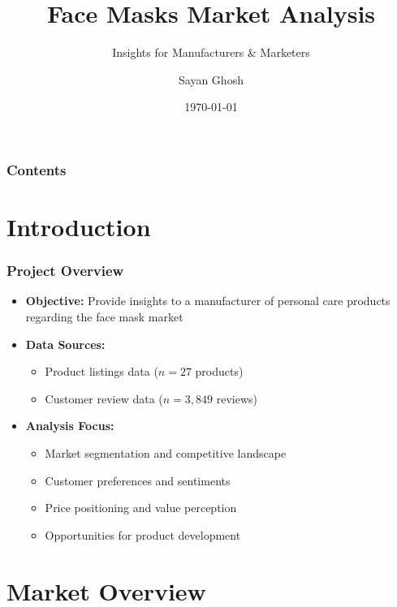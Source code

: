 \documentclass[aspectratio=169]{beamer}
\title{Face Masks Market Analysis}
\subtitle{Insights for Manufacturers \& Marketers}
\author{Sayan Ghosh}
\date{\today}
\institute{Indian Institute of Technology Madras}
\begin{document}
\begin{frame}
\titlepage
\end{frame}

\begin{frame}
\frametitle{Contents}
\tableofcontents
\end{frame}

\section{Introduction}

\begin{frame}
\frametitle{Project Overview}
\begin{itemize}
    \item \textbf{Objective:} Provide insights to a manufacturer of personal care products regarding the face mask market
    \item \textbf{Data Sources:}
    \begin{itemize}
        \item Product listings data (\(n=27\) products)
        \item Customer review data (\(n=3,849\) reviews)
    \end{itemize}
    \item \textbf{Analysis Focus:}
    \begin{itemize}
        \item Market segmentation and competitive landscape
        \item Customer preferences and sentiments
        \item Price positioning and value perception
        \item Opportunities for product development
    \end{itemize}
\end{itemize}
\end{frame}

\section{Market Overview}
\end{document}
